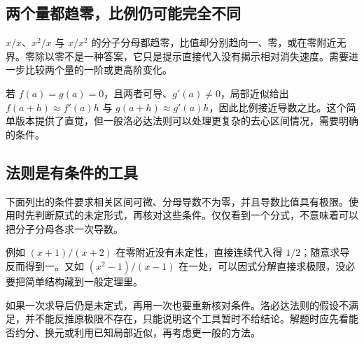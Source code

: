 \subsection*{两个量都趋零，比例仍可能完全不同}
$x/x$、$x^2/x$ 与 $x/x^2$ 的分子分母都趋零，比值却分别趋向一、零，或在零附近无界。零除以零不是一种答案，它只是提示直接代入没有揭示相对消失速度。需要进一步比较两个量的一阶或更高阶变化。

若 $f(a)=g(a)=0$，且两者可导、$g'(a)\ne0$，局部近似给出 $f(a+h)\approx f'(a)h$ 与 $g(a+h)\approx g'(a)h$，因此比例接近导数之比。这个简单版本提供了直觉，但一般洛必达法则可以处理更复杂的去心区间情况，需要明确的条件。

\subsection*{法则是有条件的工具}
下面列出的条件要求相关区间可微、分母导数不为零，并且导数比值具有极限。使用时先判断原式的未定形式，再核对这些条件。仅仅看到一个分式，不意味着可以把分子分母各求一次导数。

例如 $(x+1)/(x+2)$ 在零附近没有未定性，直接连续代入得 $1/2$；随意求导反而得到一。又如 $(x^2-1)/(x-1)$ 在一处，可以因式分解直接求极限，没必要把简单结构藏到一般定理里。

如果一次求导后仍是未定式，再用一次也要重新核对条件。洛必达法则的假设不满足，并不能反推原极限不存在，只能说明这个工具暂时不给结论。解题时应先看能否约分、换元或利用已知局部近似，再考虑更一般的方法。
